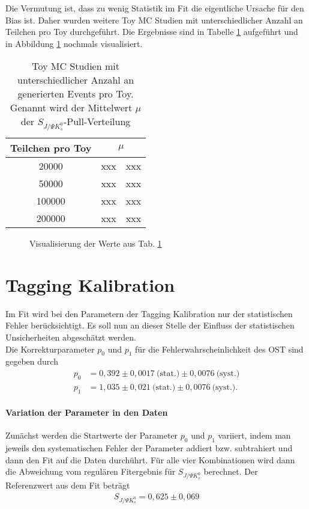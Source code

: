 \documentclass[a4paper]{scrbook}
\newcommand{\SJPsi}{S_{J/\Psi K_s^0}}
\begin{document}
Die Vermutung ist, dass zu wenig Statistik im Fit die eigentliche Ursache für den Bias ist. Daher wurden weitere Toy MC Studien mit unterschiedlicher Anzahl an Teilchen pro Toy durchgeführt. Die Ergebnisse sind in Tabelle \ref{tab:fit_bias_events} aufgeführt und in Abbildung \ref{fig:fit_bias_events} nochmals visualisiert.

\begin{table}[hptb]
\centering
\caption{Toy MC Studien mit unterschiedlicher Anzahl an generierten Events pro Toy. Genannt wird der Mittelwert $\mu$ der $\SJPsi$-Pull-Verteilung}
\label{tab:fit_bias_events}
\begin{tabular}{cr@{$\pm$}l}
\hline \hline 
Teilchen pro Toy & \multicolumn{2}{c}{$\mu$}  \\ \hline
20000            &  xxx & xxx \\
50000            &  xxx & xxx \\
100000           &  xxx & xxx \\
200000           &  xxx & xxx \\ 
\hline \hline
\end{tabular}
\end{table}

\begin{figure}[hptb]
\centering
\caption{Visualisierung der Werte aus Tab. \ref{tab:fit_bias_events}}
\label{fig:fit_bias_events}
\end{figure}

\section{Tagging Kalibration}
Im Fit wird bei den Parametern der Tagging Kalibration nur der statistischen Fehler berücksichtigt. Es soll nun an dieser Stelle der Einfluss der statistischen Unsicherheiten abgeschätzt werden. \\
Die Korrekturparameter $p_0$ und $p_1$ für die Fehlerwahrscheinlichkeit des \gls{OST} sind gegeben durch
\begin{align}
p_0 &= 0,392 \pm 0,0017\ \text{(stat.)} \pm 0,0076\ \text{(syst.)} \\
p_1 &= 1,035 \pm 0,021\ \text{(stat.)} \pm 0,0076\ \text{(syst.)}.
\end{align}

\paragraph{Variation der Parameter in den Daten}
Zunächst werden die Startwerte der Parameter $p_0$ und $p_1$ variiert, indem man jeweils den systematischen Fehler der Parameter addiert bzw. subtrahiert und dann den Fit auf die Daten durchührt. Für alle vier Kombinationen wird dann die Abweichung vom regulären Fitergebnis für $\SJPsi$ berechnet. Der Referenzwert aus dem Fit beträgt
\begin{align}
\SJPsi = 0,625 \pm 0,069
\end{align}
\end{document}
